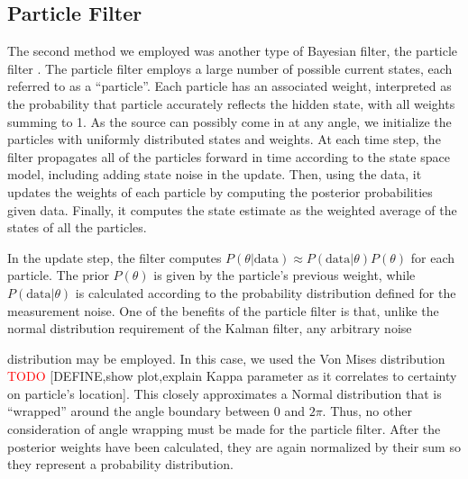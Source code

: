 \documentclass[11pt]{amsart}
\begin{document}

\subsection{Particle Filter}
The second method we employed was another type of Bayesian filter, the particle filter \cite{Particle}. The particle filter employs a large number of possible current states, each referred to 
as a “particle”. Each particle has an associated weight, interpreted as the probability that particle accurately reflects the hidden state, with all weights summing to 1. As the source can possibly 
come in at any angle, we initialize the particles with uniformly distributed states and weights. At each time step, the filter propagates all of the particles forward in time according to the state space 
model, including adding state noise in the update. Then, using the data, it updates the weights of each particle by computing the posterior probabilities given data. Finally, it computes the state estimate 
as the weighted average of the states of all the particles. 

In the update step, the filter computes $P(\theta|\text{data}) \approx P(\text{data}|\theta)P(\theta)$ for each particle. The prior $P(\theta)$ is given by the particle’s previous weight, while $P(\text{data}|\theta)$ is calculated 
according to the probability distribution defined for the measurement noise. One of the benefits of the particle filter is that, unlike the normal distribution requirement of the Kalman filter, any arbitrary noise 

distribution may be employed. In this case, we used the Von Mises distribution \textcolor{red}{TODO} [DEFINE,show plot,explain Kappa parameter as it correlates to certainty on particle's location]. This closely approximates a Normal distribution 
that is “wrapped” around the angle boundary between $0$ and $2\pi$. Thus, no other consideration of angle wrapping must be made for the particle filter. After the posterior weights have been calculated, they are again normalized by 
their sum so they represent a probability distribution.
\end{document}
